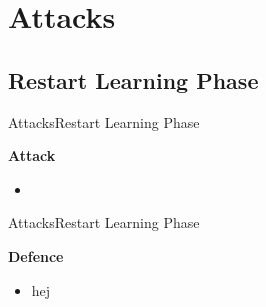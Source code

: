 \section{Attacks}
\subsection{Restart Learning Phase}
\begin{frame}{Attacks}{Restart Learning Phase}
	\begin{minipage}{0.48\textwidth}
		\textbf{Attack}
		\begin{itemize}
			\item 
		\end{itemize}	
	\end{minipage}
	\hfill
	\begin{minipage}{0.48\textwidth}
		
	\end{minipage}
\end{frame}

\begin{frame}{Attacks}{Restart Learning Phase}
	\begin{minipage}{0.48\textwidth}
		\textbf{Defence}
		\begin{itemize}
			\item hej
		\end{itemize}	
	\end{minipage}
	\hfill
	\begin{minipage}{0.48\textwidth}
		
	\end{minipage}
\end{frame}
